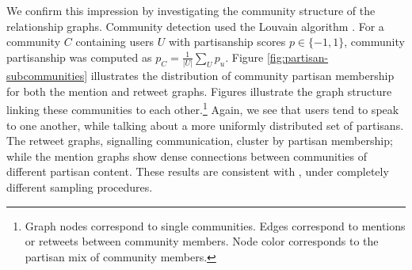 \documentclass{acm_proc_article-sp}
\begin{document}
We confirm this impression by investigating the community structure of
the relationship graphs. Community detection used the Louvain
algorithm \cite{blondel2008fast}. For a community $C$ containing
users $U$ with partisanship scores $p \in \{-1, 1\}$, community partisanship was computed
as $p_C = \frac{1}{\left|U\right|}\sum_U p_u$. Figure
\ref{fig:partisan-subcommunities} 
illustrates the distribution of community partisan membership
for both the mention and retweet graphs. Figures
 illustrate the graph
structure linking these communities to each other.\footnote{Graph
  nodes correspond to single communities. Edges correspond to mentions
or retweets between community members. Node color corresponds to the
partisan mix of community members.} Again, we see that users tend
to speak to one another, while talking about a more uniformly
distributed set of partisans. The retweet graphs, signalling
communication, cluster by partisan membership; while the mention
graphs show dense connections between communities of different
partisan content. These results are consistent with
\cite{conover2011}, under completely different sampling procedures. 





\end{document}
